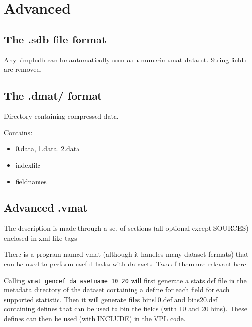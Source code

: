 \documentclass[11pt]{book}
\begin{document}



\chapter{Advanced}

\section{The .sdb file format}

Any simpledb can be automatically seen as a numeric vmat dataset. 
String fields are removed.

\section{The .dmat/ format }

Directory containing compressed data.

Contains:
\begin{itemize}
\item 0.data, 1.data, 2.data
\item indexfile
\item fieldnames
\end{itemize}

\section{Advanced .vmat}

The description is made through a set of sections (all optional except SOURCES) enclosed in xml-like tags.

There is a program named vmat (although it handles many dataset formats) that can be used to perform useful tasks with datasets. Two of them are relevant here. 

Calling \verb!vmat gendef datasetname 10 20! will first generate a stats.def file in the metadata directory of the dataset containing a define for each field for each supported statistic. Then it will generate files bins10.def and bins20.def containing defines that can be used to bin the fields (with 10 and 20 bins). These defines can then be used (with INCLUDE) in the VPL code.
\end{document}
